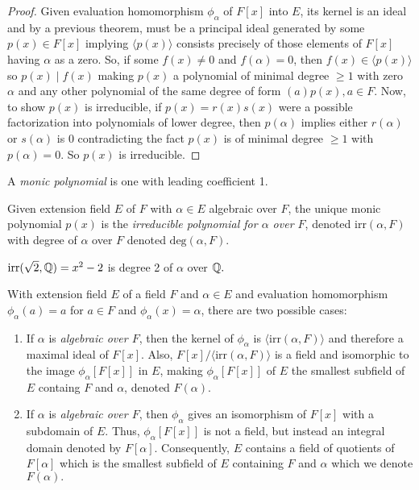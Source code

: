 \begin{proof}
    Given evaluation homomorphism $\phi_\alpha$ of $F[x]$ into $E$, its kernel is an ideal and by a previous theorem, must be a principal ideal generated by some $p(x) \in F[x]$ implying $\langle p(x) \rangle$ consists precisely of those elements of $F[x]$ having $\alpha$ as a zero. So, if some $f(x) \neq 0$ and $f(\alpha) = 0$, then $f(x) \in \langle p(x) \rangle$ so $p(x) \mid f(x)$ making $p(x)$ a polynomial of minimal degree $\geq 1$ with zero $\alpha$ and any other polynomial of the same degree of form $(a)p(x), a \in F$. Now, to show $p(x)$ is irreducible, if $p(x) = r(x)s(x)$ were a possible factorization into polynomials of lower degree, then $p(\alpha)$ implies either $r(\alpha)$ or $s(\alpha)$ is 0 contradicting the fact $p(x)$ is of minimal degree $\geq 1$ with $p(\alpha) = 0$. So $p(x)$ is irreducible.  
\end{proof}
\begin{definition}
    A \emph{monic polynomial} is one with leading coefficient 1.
\end{definition}
\begin{definition}
    Given extension field $E$ of $F$ with $\alpha \in E$ algebraic over $F$, the unique monic polynomial $p(x)$ is the \emph{irreducible polynomial for $\alpha$ over $F$}, denoted $\text{irr}(\alpha, F)$ with degree of $\alpha$ over $F$ denoted $\text{deg}(\alpha,F).$
\end{definition}
\begin{example}
    $\text{irr}(\sqrt{2},\mathbb{Q}) = x^2-2$ is  degree 2 of $\alpha$ over $\mathbb{Q}.$
\end{example}
\begin{remark}
    With extension field $E$ of a field $F$ and $\alpha \in E$ and evaluation homomorphism $\phi_\alpha(a) = a$ for $a \in F$ and $\phi_\alpha(x) = \alpha$, there are two possible cases:
    \begin{enumerate}[label = \textbf{Case \Roman*}, leftmargin=*]
        \item If $\alpha$ is \emph{algebraic over $F$}, then the kernel of $\phi_\alpha$ is $\langle \text{irr}(\alpha, F)\rangle$ and therefore a maximal ideal of $F[x]$. Also, $F[x] / \langle \text{irr}(\alpha, F)\rangle$ is a field and isomorphic to the image $\phi_\alpha[F[x]]$ in $E$, making $\phi_\alpha[F[x]]$ of $E$ the smallest subfield of $E$ containg $F$ and $\alpha$, denoted $F(\alpha).$
        \item If $\alpha$ is \emph{algebraic over $F$}, then $\phi_\alpha$ gives an isomorphism of $F[x]$ with a subdomain of $E$. Thus, $\phi_\alpha[F[x]]$ is not a field, but instead an integral domain denoted by $F[\alpha]$. Consequently, $E$ contains a field of quotients of $F[\alpha]$ which is the smallest subfield of $E$ containing $F$ and $\alpha$ which we denote $F(\alpha).$
    \end{enumerate}
\end{remark}
